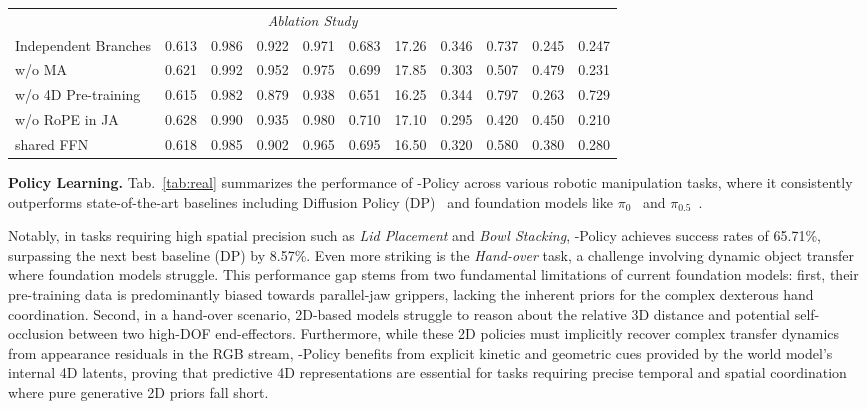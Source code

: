 \begin{table}[t]
\begin{tabular}{l ccc ccc c cc c}
    \midrule
    \multicolumn{11}{c}{\textit{Ablation Study}} \\
    \rowcolor{gray!10} Independent Branches  & 0.613 & 0.986 & 0.922 & 0.971 & 0.683 & 17.26 & 0.346 & 0.737 & 0.245 & 0.247 \\
    w/o MA & 0.621 & 0.992 & 0.952 & 0.975 & 0.699 & 17.85 & 0.303 & 0.507 & 0.479 & 0.231 \\
    \rowcolor{gray!10} w/o 4D Pre-training & 0.615 & 0.982 & 0.879 & 0.938 & 0.651 & 16.25 & 0.344 & 0.797 & 0.263 & 0.729 \\
    w/o RoPE in JA & 0.628 & 0.990 & 0.935 & 0.980 & 0.710 & 17.10 & 0.295 & 0.420 & 0.450 & 0.210 \\
    \rowcolor{gray!10} shared FFN & 0.618 & 0.985 & 0.902 & 0.965 & 0.695 & 16.50 & 0.320 & 0.580 & 0.380 & 0.280 \\

    \bottomrule    
    \end{tabular}
\end{table}









\noindent 
\textbf{Policy Learning.}
Tab.~\ref{tab:real} summarizes the performance of \our-Policy across various robotic manipulation tasks, where it consistently outperforms state-of-the-art baselines including Diffusion Policy (DP)~\citep{chi2025diffusion} and foundation models like $\pi_0$~\citep{black2024pi_0} and $\pi_{0.5}$~\citep{intelligence2025pi_}.

Notably, in tasks requiring high spatial precision such as \textit{Lid Placement} and \textit{Bowl Stacking}, \our-Policy achieves success rates of 65.71\%, surpassing the next best baseline (DP) by 8.57\%. 
Even more striking is the \textit{Hand-over} task, a challenge involving dynamic object transfer where foundation models struggle. 
This performance gap stems from two fundamental limitations of current foundation models: first, their pre-training data is predominantly biased towards parallel-jaw grippers, lacking the inherent priors for the complex dexterous hand coordination. Second, in a hand-over scenario, 2D-based models struggle to reason about the relative 3D distance and potential self-occlusion between two high-DOF end-effectors.
Furthermore, while these 2D policies must implicitly recover complex transfer dynamics from appearance residuals in the RGB stream, \our-Policy benefits from explicit kinetic and geometric cues provided by the world model's internal 4D latents, proving that predictive 4D representations are essential for tasks requiring precise temporal and spatial coordination where pure generative 2D priors fall short.


